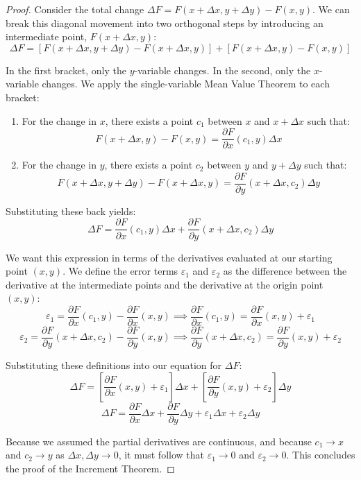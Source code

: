 \documentclass{essay}
\begin{document}
\begin{proof}
Consider the total change $\Delta F = F(x+\Delta x, y+\Delta y) - F(x,y)$. We can break this diagonal movement into two orthogonal steps by introducing an intermediate point, $F(x+\Delta x, y)$:
\[ \Delta F = [F(x+\Delta x, y+\Delta y) - F(x+\Delta x, y)] + [F(x+\Delta x, y) - F(x,y)] \]

In the first bracket, only the $y$-variable changes. In the second, only the $x$-variable changes. We apply the single-variable Mean Value Theorem to each bracket:
\begin{enumerate}
    \item For the change in $x$, there exists a point $c_1$ between $x$ and $x+\Delta x$ such that:
    \[ F(x+\Delta x, y) - F(x,y) = \frac{\partial F}{\partial x}(c_1, y) \Delta x \]
    \item For the change in $y$, there exists a point $c_2$ between $y$ and $y+\Delta y$ such that:
    \[ F(x+\Delta x, y+\Delta y) - F(x+\Delta x, y) = \frac{\partial F}{\partial y}(x+\Delta x, c_2) \Delta y \]
\end{enumerate}

Substituting these back yields:
\[ \Delta F = \frac{\partial F}{\partial x}(c_1, y) \Delta x + \frac{\partial F}{\partial y}(x+\Delta x, c_2) \Delta y \]

We want this expression in terms of the derivatives evaluated at our starting point $(x,y)$. We define the error terms $\varepsilon_1$ and $\varepsilon_2$ as the difference between the derivative at the intermediate points and the derivative at the origin point $(x,y)$:
\[ \varepsilon_1 = \frac{\partial F}{\partial x}(c_1, y) - \frac{\partial F}{\partial x}(x, y) \implies \frac{\partial F}{\partial x}(c_1, y) = \frac{\partial F}{\partial x}(x, y) + \varepsilon_1 \]
\[ \varepsilon_2 = \frac{\partial F}{\partial y}(x+\Delta x, c_2) - \frac{\partial F}{\partial y}(x, y) \implies \frac{\partial F}{\partial y}(x+\Delta x, c_2) = \frac{\partial F}{\partial y}(x, y) + \varepsilon_2 \]

Substituting these definitions into our equation for $\Delta F$:
\[ \Delta F = \left[ \frac{\partial F}{\partial x}(x, y) + \varepsilon_1 \right] \Delta x + \left[ \frac{\partial F}{\partial y}(x, y) + \varepsilon_2 \right] \Delta y \]
\[ \Delta F = \frac{\partial F}{\partial x}\Delta x + \frac{\partial F}{\partial y}\Delta y + \varepsilon_1 \Delta x + \varepsilon_2 \Delta y \]

Because we assumed the partial derivatives are continuous, and because $c_1 \to x$ and $c_2 \to y$ as $\Delta x, \Delta y \to 0$, it must follow that $\varepsilon_1 \to 0$ and $\varepsilon_2 \to 0$. This concludes the proof of the Increment Theorem.
\end{proof}
\end{document}
